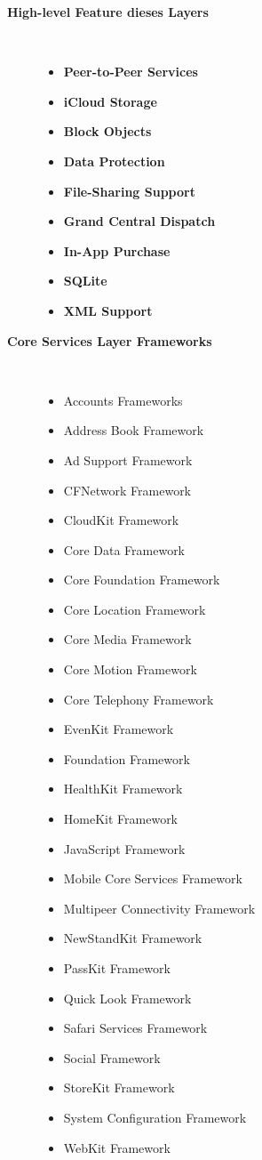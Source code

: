 \begin{description}
	\item[\textbf{High-level Feature dieses Layers}]~\par
	\begin{itemize}
		\item \textbf{Peer-to-Peer Services}
		\item \textbf{iCloud Storage}
		\item \textbf{Block Objects}
		\item \textbf{Data Protection}
		\item \textbf{File-Sharing Support}
		\item \textbf{Grand Central Dispatch}
		\item \textbf{In-App Purchase}
		\item \textbf{SQLite}
		\item \textbf{XML Support} 
	\end{itemize}
	
	\item[\textbf{Core Services Layer Frameworks}]~\par
	\begin{multicols}{2}
	\begin{itemize}
		\item Accounts Frameworks
		\item Address Book Framework
		\item Ad Support Framework
		\item CFNetwork Framework
		\item CloudKit Framework
		\item Core Data Framework
		\item Core Foundation Framework
		\item Core Location Framework
		\item Core Media Framework
		\item Core Motion Framework
		\item Core Telephony Framework
		\item EvenKit Framework
		\item Foundation Framework
		\item HealthKit Framework
		\item HomeKit Framework
		\item JavaScript Framework
		\item Mobile Core Services Framework
		\item Multipeer Connectivity Framework
		\item NewStandKit Framework
		\item PassKit Framework
		\item Quick Look Framework
		\item Safari Services Framework
		\item Social Framework
		\item StoreKit Framework
		\item System Configuration Framework
		\item WebKit Framework
	\end{itemize}
	\end{multicols}
\end{description}


